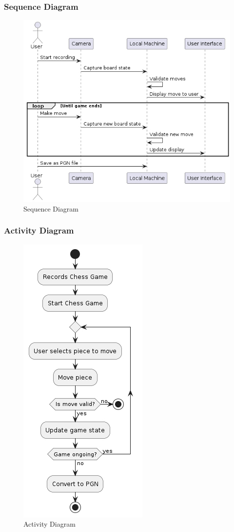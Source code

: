 \subsubsection*{Sequence Diagram}
\label{subsubsec:sequence-diagram}

\begin{figure}[h!]
    \centering
    \includegraphics[width=0.75\linewidth]{figures/uml/sequence.png}
    \caption[Sequence Diagram]{Sequence Diagram}
    \label{fig:sequence}
\end{figure}

\subsubsection*{Activity Diagram}
\label{subsubsec:activity-diagram}

\begin{figure}[h!]
    \centering
    \includegraphics[height=0.75\linewidth]{figures/uml/activity.png}
    \caption[Activity Diagram]{Activity Diagram}
    \label{fig:activity}
\end{figure}

